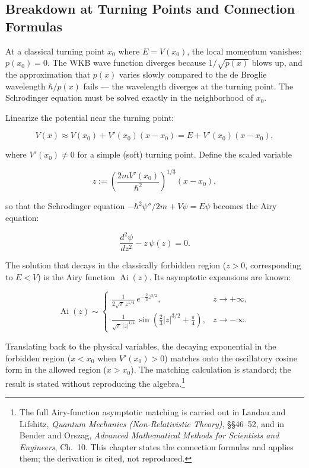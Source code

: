 \subsection{Breakdown at Turning Points and Connection Formulas}

At a classical turning point $x_0$ where $E = V(x_0)$, the local momentum vanishes: $p(x_0) = 0$. The WKB wave function diverges because $1/\sqrt{p(x)}$ blows up, and the approximation that $p(x)$ varies slowly compared to the de Broglie wavelength $\hbar/p(x)$ fails --- the wavelength diverges at the turning point. The Schrodinger equation must be solved exactly in the neighborhood of $x_0$.

Linearize the potential near the turning point:
\begin{linenomath}
\begin{equation}
V(x) \approx V(x_0) + V'(x_0)(x-x_0) = E + V'(x_0)(x-x_0),
\end{equation}
\end{linenomath}
where $V'(x_0) \neq 0$ for a simple (soft) turning point. Define the scaled variable
\begin{linenomath}
\begin{equation}
z := \left(\frac{2mV'(x_0)}{\hbar^2}\right)^{1/3}(x - x_0),
\end{equation}
\end{linenomath}
so that the Schrodinger equation $-\hbar^2\psi''/2m + V\psi = E\psi$ becomes the Airy equation:
\begin{linenomath}
\begin{equation*}
\frac{d^2\psi}{dz^2} - z\,\psi(z) = 0.
\end{equation*}
\end{linenomath}
The solution that decays in the classically forbidden region ($z>0$, corresponding to $E<V$) is the Airy function $\operatorname{Ai}(z)$. Its asymptotic expansions are known:
\begin{linenomath}
\begin{equation}
\operatorname{Ai}(z) \sim
\begin{cases}
\displaystyle \frac{1}{2\sqrt{\pi}\,z^{1/4}}\,e^{-\frac{2}{3}z^{3/2}}, & z \to +\infty,\\[10pt]
\displaystyle \frac{1}{\sqrt{\pi}\,|z|^{1/4}}\,\sin\left(\frac{2}{3}|z|^{3/2} + \frac{\pi}{4}\right), & z \to -\infty.
\end{cases}
\end{equation}
\end{linenomath}
Translating back to the physical variables, the decaying exponential in the forbidden region ($x < x_0$ when $V'(x_0) > 0$) matches onto the oscillatory cosine form in the allowed region ($x > x_0$). The matching calculation is standard; the result is stated without reproducing the algebra.\footnote{The full Airy-function asymptotic matching is carried out in Landau and Lifshitz, \emph{Quantum Mechanics (Non-Relativistic Theory)}, \S\S 46--52, and in Bender and Orszag, \emph{Advanced Mathematical Methods for Scientists and Engineers}, Ch.~10. This chapter states the connection formulas and applies them; the derivation is cited, not reproduced.}

